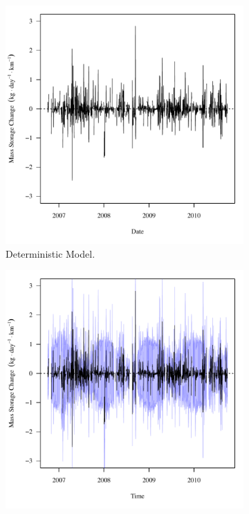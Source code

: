 \begin{linenumbers}
\begin{figure}[htbp]
\centering
	\begin{subfigure}{0.5\textwidth}
		\includegraphics[width=0.9\linewidth]{"Figures/Results_DUSR/f Segment A"}
		\caption{Deterministic Model.}
		\label{sub:ExampleDSeMassChange}
	\end{subfigure}%
	\begin{subfigure}{0.5\textwidth}
		\includegraphics[width=0.9\linewidth]{"Figures/Results_USR/f Segment A"}

\end{subfigure}
\end{figure}
\end{linenumbers}
